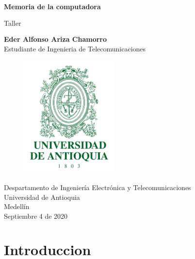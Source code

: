\documentclass{article}
\begin{document}
\begin{titlepage}
	
    \begin{center}
	
		\vspace*{1cm}
	
		\Huge
		\textbf{Memoria de la computadora}
	
		\vspace{0.5cm}
	
		\LARGE
		Taller
	
		\vspace{0.5cm}
	
		\LARGE
		\textbf{Eder Alfonso Ariza Chamorro}\\
		Estudiante de Ingenieria de Telecomunicaciones\\
	
		\vspace*{1.5cm}
	
		\begin{figure}[h]
			\includegraphics[width=5cm]{Logo UdeA.png}
			\centering
			\label{fig:Logo UdeA}
		\end{figure}
	
		\vspace*{2cm}
	
		\Large
		Despartamento de Ingeniería Electrónica y Telecomunicaciones\\
		Universidad de Antioquia\\
		Medellín\\
		Septiembre 4 de 2020
	
	\end{center}

\end{titlepage}

\tableofcontents
\newpage


\section{Introduccion}\label{intro}
\end{document}
